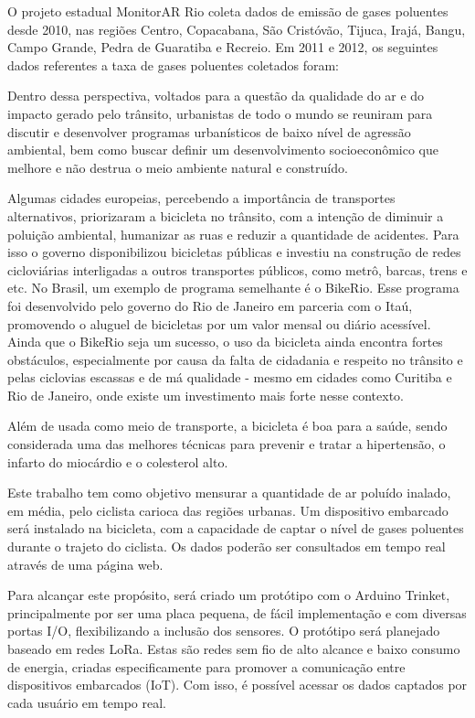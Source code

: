 O projeto estadual MonitorAR Rio coleta dados de emissão de gases poluentes desde 2010, 
nas regiões Centro, Copacabana, São Cristóvão, Tijuca, Irajá, Bangu, Campo Grande, 
Pedra de Guaratiba e Recreio. Em 2011 e 2012, os seguintes dados referentes a taxa de 
gases poluentes coletados foram:


Dentro dessa perspectiva, voltados para a questão da qualidade do ar e do impacto 
gerado pelo trânsito, urbanistas de todo o mundo se reuniram para discutir e desenvolver 
programas urbanísticos de baixo nível de agressão ambiental, bem como buscar definir um 
desenvolvimento socioeconômico que melhore e não destrua o meio ambiente natural e 
construído.

Algumas cidades europeias, percebendo a importância de transportes alternativos, 
priorizaram a bicicleta no trânsito, com a intenção de diminuir a poluição ambiental, 
humanizar as ruas e reduzir a quantidade de acidentes. Para isso o governo disponibilizou 
bicicletas públicas e investiu na construção de redes cicloviárias interligadas a outros 
transportes públicos, como metrô, barcas, trens e etc. No Brasil, um exemplo de programa 
semelhante é o BikeRio. Esse programa foi desenvolvido pelo governo do Rio de Janeiro em 
parceria com o Itaú, promovendo o aluguel de bicicletas por um valor mensal ou diário 
acessível. Ainda que o BikeRio seja um sucesso, o uso da bicicleta ainda encontra fortes 
obstáculos, especialmente por causa da falta de cidadania e respeito no trânsito e pelas 
ciclovias escassas e de má qualidade - mesmo em cidades como Curitiba e Rio de Janeiro, 
onde existe um investimento mais forte nesse contexto.

Além de usada como meio de transporte, a bicicleta é boa para a saúde, sendo considerada 
uma das melhores técnicas para prevenir e tratar a hipertensão, o infarto do miocárdio e 
o colesterol alto.

Este trabalho tem como objetivo mensurar a quantidade de ar poluído inalado, em média, pelo 
ciclista carioca das regiões urbanas. Um dispositivo embarcado será instalado na bicicleta, 
com a capacidade de captar o nível de gases poluentes durante o trajeto do ciclista. Os 
dados poderão ser consultados em tempo real através de uma página web.

Para alcançar este propósito, será criado um protótipo com o Arduino Trinket, principalmente 
por ser uma placa pequena, de fácil implementação e com diversas portas I/O, flexibilizando 
a inclusão dos sensores. O protótipo será planejado baseado em redes LoRa. Estas são redes 
sem fio de alto alcance e baixo consumo de energia, criadas especificamente para promover a 
comunicação entre dispositivos embarcados (IoT). Com isso, é possível acessar os dados 
captados por cada usuário em tempo real.

